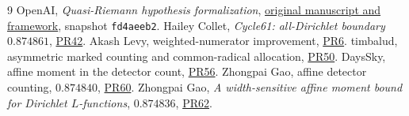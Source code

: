 \documentclass[10pt,a4paper]{article}
\begin{document}
\begin{thebibliography}{9}\small
{} OpenAI, \emph{Quasi-Riemann hypothesis formalization},
\href{https://github.com/openai/math/blob/fd4aeeb2ee4fc729c18d98444fed42fd0529eeeb/lean/docs/003.md}{original manuscript and framework}, snapshot \texttt{fd4aeeb2}.
 Hailey Collet, \emph{Cycle61: all-Dirichlet boundary
$0.874861$}, \href{https://github.com/GTimG/QuasiRiemannTracker/pull/42}{PR42}.
 Akash Levy, weighted-numerator improvement,
\href{https://github.com/GTimG/QuasiRiemannTracker/pull/6}{PR6}.
 timbalud, asymmetric marked counting and common-radical
allocation, \href{https://github.com/GTimG/QuasiRiemannTracker/pull/50}{PR50}.
 DaysSky, affine moment in the detector count,
\href{https://github.com/GTimG/QuasiRiemannTracker/pull/56}{PR56}.
 Zhongpai Gao, affine detector counting, $0.874840$,
\href{https://github.com/GTimG/QuasiRiemannTracker/pull/60}{PR60}.
 Zhongpai Gao, \emph{A width-sensitive affine moment
bound for Dirichlet $L$-functions}, $0.874836$,
\href{https://github.com/GTimG/QuasiRiemannTracker/pull/62}{PR62}.
\end{thebibliography}
\end{document}
